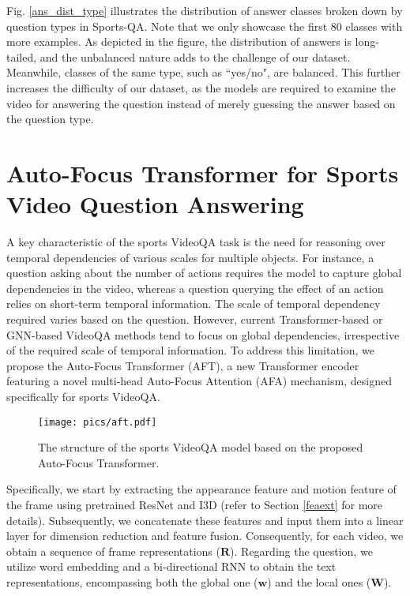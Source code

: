 Fig. \ref{ans_dist_type} illustrates the distribution of answer classes broken down by question types in Sports-QA. Note that we only showcase the first 80 classes with more examples. As depicted in the figure, the distribution of answers is long-tailed, and the unbalanced nature adds to the challenge of our dataset. Meanwhile, classes of the same type, such as ``yes/no", are balanced. This further increases the difficulty of our dataset, as the models are required to examine the video for answering the question instead of merely guessing the answer based on the question type. 

\section{Auto-Focus Transformer for Sports Video Question Answering}

A key characteristic of the sports VideoQA task is the need for reasoning over temporal dependencies of various scales for multiple objects. For instance, a question asking about the number of actions requires the model to capture global dependencies in the video, whereas a question querying the effect of an action relies on short-term temporal information. The scale of temporal dependency required varies based on the question. However, current Transformer-based or GNN-based VideoQA methods tend to focus on global dependencies, irrespective of the required scale of temporal information. To address this limitation, we propose the Auto-Focus Transformer (AFT), a new Transformer encoder featuring a novel multi-head Auto-Focus Attention (AFA) mechanism, designed specifically for sports VideoQA.

\begin{figure}[tbp]
\centering
\texttt{[image: pics/aft.pdf]}
\caption{The structure of the sports  VideoQA model based on the proposed Auto-Focus Transformer.}
\label{aft}
\end{figure}

Specifically, we start by extracting the appearance feature and motion feature of the frame using pretrained ResNet \citep{he2016deep} and I3D \citep{carreira2017quo} (refer to Section \ref{feaext} for more details). Subsequently, we concatenate these features and input them into a linear layer for dimension reduction and feature fusion. Consequently, for each video, we obtain a sequence of frame representations ($\bm{R}$). Regarding the question, we utilize word embedding and a bi-directional RNN to obtain the text representations, encompassing both the global one ($\bm{w}$) and the local ones ($\bm{W}$).


